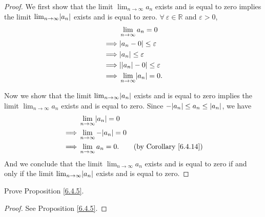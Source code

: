 \begin{proof}
We first show that the limit \(\lim_{n \to \infty} a_n\) exists and is equal to zero implies the limit \(\lim_{n \to \infty} \abs*{a_n}\) exists and is equal to zero.
\(\forall\ \varepsilon \in \mathds{R}\) and \(\varepsilon > 0\),
\begin{align*}
& \lim_{n \to \infty} a_n = 0 \\
\implies & \abs*{a_n - 0} \leq \varepsilon \\
\implies & \abs*{a_n} \leq \varepsilon \\
\implies & \abs*{\abs*{a_n} - 0} \leq \varepsilon \\
\implies & \lim_{n \to \infty} \abs*{a_n} = 0.
\end{align*}

Now we show that the limit \(\lim_{n \to \infty} \abs*{a_n}\) exists and is equal to zero implies the limit \(\lim_{n \to \infty} a_n\) exists and is equal to zero.
Since \(-\abs*{a_n} \leq a_n \leq \abs*{a_n}\), we have
\begin{align*}
& \lim_{n \to \infty} \abs*{a_n} = 0 \\
\implies & \lim_{n \to \infty} -\abs*{a_n} = 0 \\
\implies & \lim_{n \to \infty} a_n = 0. & \text{(by Corollary \ref{6.4.14})}
\end{align*}
And we conclude that the limit \(\lim_{n \to \infty} a_n\) exists and is equal to zero if and only if the limit \(\lim_{n \to \infty} \abs*{a_n}\) exists and is equal to zero.
\end{proof}

\exercisesection

\begin{exercise}\label{ex 6.4.1}
Prove Proposition \ref{6.4.5}.
\end{exercise}

\begin{proof}
See Proposition \ref{6.4.5}.
\end{proof}

